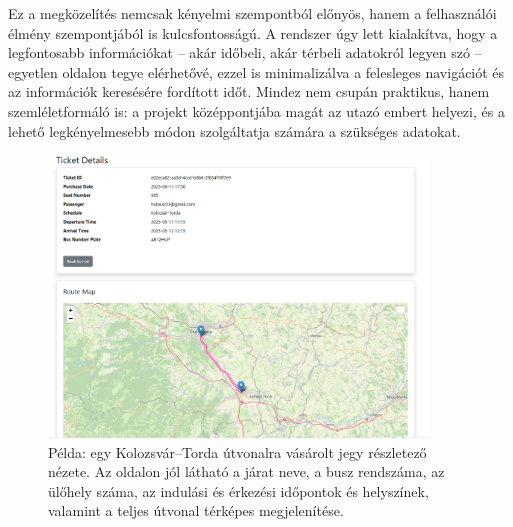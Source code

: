 Ez a megközelítés nemcsak kényelmi szempontból előnyös, hanem a felhasználói élmény szempontjából is kulcsfontosságú. A rendszer úgy lett kialakítva, hogy a legfontosabb információkat – akár időbeli, akár térbeli adatokról legyen szó – egyetlen oldalon tegye elérhetővé, ezzel is minimalizálva a felesleges navigációt és az információk keresésére fordított időt. Mindez nem csupán praktikus, hanem szemléletformáló is: a projekt középpontjába magát az utazó embert helyezi, és a lehető legkényelmesebb módon szolgáltatja számára a szükséges adatokat.

\begin{figure}[H]
    \centering
    \includegraphics[width=0.9\textwidth]{Szakdolgozat/Mellekletek/ticketdetail.PNG}
    \caption{Példa: egy Kolozsvár–Torda útvonalra vásárolt jegy részletező nézete. Az oldalon jól látható a járat neve, a busz rendszáma, az ülőhely száma, az indulási és érkezési időpontok és helyszínek, valamint a teljes útvonal térképes megjelenítése.}
    \label{fig:ticket-detail-kolozsvar-torda}
\end{figure}


